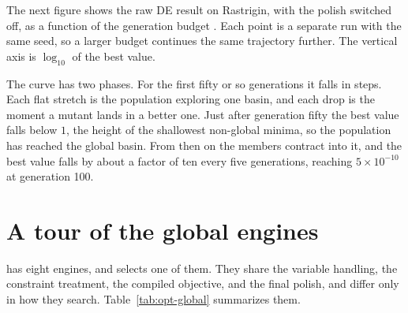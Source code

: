 The next figure shows the raw DE result on Rastrigin, with the polish switched
off, as a function of the generation budget . Each point is a
separate run with the same seed, so a larger budget continues the same
trajectory further. The vertical axis is \(\log_{10}\) of the best value.


The curve has two phases. For the first fifty or so generations it falls in
steps. Each flat stretch is the population exploring one basin, and each drop
is the moment a mutant lands in a better one. Just after generation fifty the
best value falls below \(1\), the height of the shallowest non-global minima,
so the population has reached the global basin. From then on the members
contract into it, and the best value falls by about a factor of ten every five
generations, reaching \(5\times10^{-10}\) at generation 100.


\section{A tour of the global engines}
\label{sec:opt-engines}

 has eight engines, and  selects one of them. They share the variable handling, the
constraint treatment, the compiled objective, and the final polish, and differ
only in how they search. Table~\ref{tab:opt-global} summarizes them.

